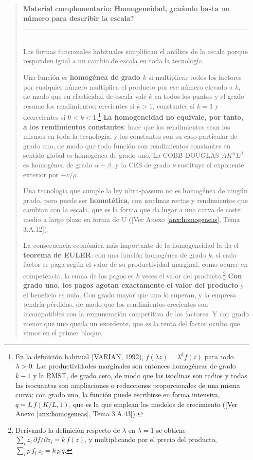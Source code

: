 \documentclass[10pt,a4paper]{article}
\newenvironment{specialblock}[1]{%
      \begin{quote} %
      \small %
      \noindent\textbf{#1}\\[-0.3em] %
      \rule{\linewidth}{0.4pt}\\[0.6em]}{
      \end{quote}}
\newcommand{\authorfont}[1]{{\fontfamily{EBGaramond-TLF}\selectfont #1}}
\begin{document}
\begin{specialblock}{\textbf{Material complementario}: Homogeneidad, ¿cuándo basta un número para describir la escala?}
Las formas funcionales habituales simplifican el análisis de la escala porque responden igual a un cambio de escala en toda la tecnología. 

Una función es \textbf{homogénea de grado $k$} si multiplicar todos los factores por cualquier número multiplica el producto por ese número elevado a $k$, de modo que su elasticidad de escala vale $k$ en todos los puntos y el grado resume los rendimientos: crecientes si $k>1$, constantes si $k=1$ y decrecientes si $0<k<1$.\footnote{%
    En la definición habitual (VARIAN, 1992), $f(\lambda z)=\lambda^k f(z)$ para todo $\lambda>0$. Las productividades marginales son entonces homogéneas de grado $k-1$ y la RMST, de grado cero, de modo que las isoclinas son radios y todas las isocuantas son ampliaciones o reducciones proporcionales de una misma curva; con grado uno, la función puede escribirse en forma intensiva, $q=L\,f(K/L,1)$, que es la que emplean los modelos de crecimiento ([\authorfont{Ver Anexo \ref{anx:homogeneas}, Tema 3.A.43}]).
} \textbf{La homogeneidad no equivale, por tanto, a los rendimientos constantes}: hace que los rendimientos sean los mismos en toda la tecnología, y los constantes son su caso particular de grado uno, de modo que toda función con rendimientos constantes en sentido global es homogénea de grado uno. La COBB-DOUGLAS $AK^\alpha L^\beta$ es homogénea de grado $\alpha+\beta$, y la CES de grado $\nu$ sustituye el exponente exterior por $-\nu/\rho$. 

Una tecnología que cumple la ley ultra-passum no es homogénea de ningún grado, pero puede ser \textbf{homotética}, con isoclinas rectas y rendimientos que cambian con la escala, que es la forma que da lugar a una curva de coste medio a largo plazo en forma de U ([\authorfont{Ver Anexo \ref{anx:homogeneas}, Tema 3.A.12}]).

La consecuencia económica más importante de la homogeneidad la da el \textbf{teorema de EULER}: con una función homogénea de grado $k$, si cada factor se paga según el valor de su productividad marginal, como ocurre en competencia, la suma de los pagos es $k$ veces el valor del producto.\footnote{%
    Derivando la definición respecto de $\lambda$ en $\lambda=1$ se obtiene $\sum_i z_i\,\partial f/\partial z_i=k\,f(z)$, y multiplicando por el precio del producto, $\sum_i p\,f_i\,z_i=k\,p\,q$.
} \textbf{Con grado uno, los pagos agotan exactamente el valor del producto} y el beneficio es nulo. Con grado mayor que uno lo superan, y la empresa tendría pérdidas, de modo que los rendimientos crecientes son incompatibles con la remuneración competitiva de los factores. Y con grado menor que uno queda un excedente, que es la renta del factor oculto que vimos en el primer bloque. 


\end{specialblock}
\end{document}
